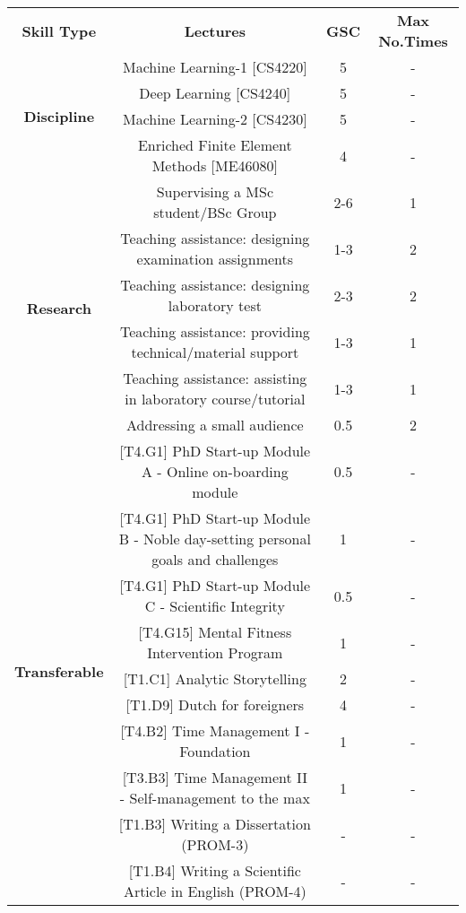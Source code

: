 \documentclass[border={5pt 5pt 5pt 5pt}]{standalone}
\begin{document}
	

\setlength{\arrayrulewidth}{0.8mm}
\setlength{\tabcolsep}{18pt}
\renewcommand{\arraystretch}{2.5}



\begin{tabular}{ cccc  }

\rowcolor{white} \multicolumn{4}{c}{\textbf{\huge Tentative Curriculum}} \\
\hline
\large{\textbf{Skill Type}	}&	\large\textbf{Lectures}		& \large\textbf{GSC}  & \textbf{Max No.Times} \\
\hline

\multirow{4}{*}{\Large\textbf{Discipline}}
	&Machine Learning-1 [CS4220] & 5 & -\\
    &Deep Learning [CS4240] &5 &-\\
    &Machine Learning-2 [CS4230] &5 &-\\
    &Enriched Finite Element Methods [ME46080] &4 &-\\ 
\hline

\multirow{6}{*}{\Large\textbf{Research}}
	&Supervising a MSc student/BSc Group & 2-6 &1\\
    &Teaching assistance: designing examination assignments & 1-3 &2\\
    &Teaching assistance: designing laboratory test & 2-3 &2 \\
    &Teaching assistance: providing technical/material support & 1-3 &1\\
    &Teaching assistance: assisting in laboratory course/tutorial & 1-3 &1 \\
    &Addressing a small audience & 0.5 &2 \\
\hline

\multirow{10}{*}{\Large\textbf{Transferable}}
	&[T4.G1] PhD Start-up Module A - Online on-boarding module &0.5 &-\\
    &[T4.G1] PhD Start-up Module B - Noble day-setting personal goals and challenges &1 &-\\
    &[T4.G1] PhD Start-up Module C - Scientific Integrity &0.5 &-\\
    &[T4.G15] Mental Fitness Intervention Program &1 &-\\
    &[T1.C1] Analytic Storytelling &2 &-\\
    &[T1.D9] Dutch for foreigners &4 &- \\
    &[T4.B2] Time Management I - Foundation &1 &- \\
    &[T3.B3] Time Management II - Self-management to the max &1 &-\\
    &[T1.B3] Writing a Dissertation (PROM-3) &- &- \\
    &[T1.B4] Writing a Scientific Article in English (PROM-4) &- &-\\
    
    
    

\end{tabular}
\end{document}
